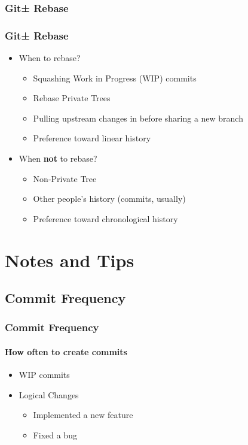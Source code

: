 \documentclass[]{beamer}
\begin{document}
\begin{frame}
\frametitle{Git± Rebase}
\begin{figure}
\end{figure}
\end{frame}

\begin{frame}
\frametitle{Git± Rebase}
\begin{itemize}
\item{When to rebase?}
\begin{itemize}
\item{Squashing Work in Progress (WIP) commits}
\item{Rebase Private Trees}
\item{Pulling upstream changes in before sharing a new branch}
\item{Preference toward linear history}
\end{itemize}
\item{When \textbf{not} to rebase?}
\begin{itemize}
\item{Non-Private Tree}
\item{Other people's history (commits, usually)}
\item{Preference toward chronological history}
\end{itemize}
\end{itemize}
\end{frame}

\section{Notes and Tips}
\subsection{Commit Frequency}
\begin{frame}
\frametitle{Commit Frequency}
\framesubtitle{How often to create commits}
\begin{itemize}
\item{WIP commits}
\item{Logical Changes}
\begin{itemize}
\item{Implemented a new feature}
\item{Fixed a bug}
\end{itemize}
\end{itemize}
\end{frame}
\end{document}
